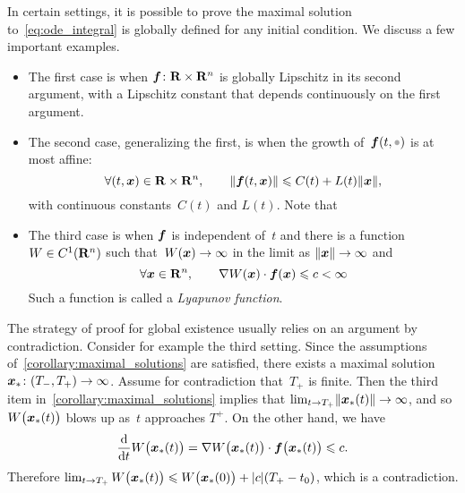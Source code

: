 In certain settings,
it is possible to prove the maximal solution to~\eqref{eq:ode_integral} is globally defined for any initial condition.
We discuss a few important examples.
\begin{itemize}
    \item
        The first case is when $\mathbf{\boldsymbol{f}}\colon \mathbf R \times \mathbf R^n$ is globally Lipschitz in its second argument,
        with a Lipschitz constant that depends continuously on the first argument.

    \item
        The second case,
        generalizing the first, 
        is when the growth of~$\vect f(t, \placeholder)$ is at most affine:
        \[
            \forall (t, \mathbf{\boldsymbol{x}}) \in \mathbf R \times \mathbf R^n, \qquad
            \lVert \mathbf{\boldsymbol{f}}(t, \mathbf{\boldsymbol{x}}) \rVert \leqslant C(t) + L(t) \lVert \mathbf{\boldsymbol{x}} \rVert,
        \]
        with continuous constants~$C(t)$ and $L(t)$.
        Note that 

    \item
        The third case is when $\mathbf{\boldsymbol{f}}$ is independent of~$t$ and there is a function~$W \in C^1(\mathbf R^n)$ such that~$W(\mathbf{\boldsymbol{x}}) \to \infty$ in the limit as $\lVert\mathbf{\boldsymbol{x}}\rVert \to \infty$
        and
        \[
            \forall \mathbf{\boldsymbol{x}} \in \mathbf R^n, \qquad
            \nabla W(\mathbf{\boldsymbol{x}}) \cdot \mathbf{\boldsymbol{f}}(\mathbf{\boldsymbol{x}}) \leqslant c < \infty
        \]
        Such a function is called a \emph{Lyapunov function}.
\end{itemize}
The strategy of proof for global existence usually relies on an argument by contradiction.
Consider for example the third setting.
Since the assumptions of~\cref{corollary:maximal_solutions} are satisfied,
there exists a maximal solution $\mathbf{\boldsymbol{x}}_*\colon (T_-, T_+) \to \infty$.
Assume for contradiction that~$T_+$ is finite.
Then the third item in~\cref{corollary:maximal_solutions} implies that $\lim_{t \to T_+} \lVert\mathbf{\boldsymbol{x}}_*(t)\rVert \to \infty$,
and so~$W\bigl(\mathbf{\boldsymbol{x}}_*(t)\bigr)$ blows up as~$t$ approaches $T^+$.
On the other hand, we have
\[
    \frac{\mathrm d}{\mathrm d t} W\bigl(\mathbf{\boldsymbol{x}}_*(t)\bigr) = \nabla W\bigl(\mathbf{\boldsymbol{x}}_*(t)\bigr) \cdot \mathbf{\boldsymbol{f}}\bigl(\mathbf{\boldsymbol{x}}_*(t)\bigr) \leqslant c.
\]
Therefore $\lim_{t \to T_+} W\bigl(\mathbf{\boldsymbol{x}}_*(t)\bigr) \leqslant W\bigl(\mathbf{\boldsymbol{x}}_*(0)\bigr) + \lvert c \rvert (T_+ - t_0)$,
which is a contradiction.

